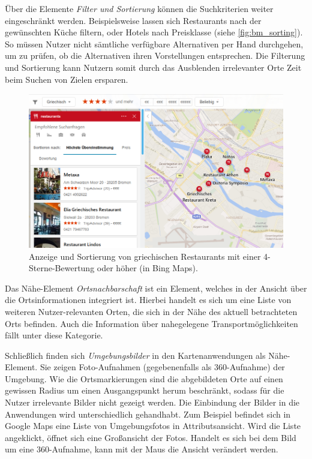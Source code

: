 Über die Elemente \emph{Filter und Sortierung} können die Suchkriterien weiter eingeschränkt werden.
Beispielsweise lassen sich Restaurants nach der gewünschten Küche filtern, oder Hotels nach Preisklasse (siehe \autoref{fig:bm_sorting}).
So müssen Nutzer nicht sämtliche verfügbare Alternativen per Hand durchgehen, um zu prüfen, ob die Alternativen ihren Vorstellungen entsprechen.
Die Filterung und Sortierung kann Nutzern somit durch das Ausblenden irrelevanter Orte Zeit beim Suchen von Zielen ersparen.
\begin{figure}[h]
    \includegraphics[width=\linewidth]{figures/map-app_examples/bm_filter_sorting}
    \caption{Anzeige und Sortierung von griechischen Restaurants mit einer 4-Sterne-Bewertung oder höher (in Bing Maps).}
    \label{fig:bm_sorting}
\end{figure}

Das Nähe-Element \emph{Ortsnachbarschaft} ist ein Element, welches in der Ansicht über die Ortsinformationen integriert ist.
Hierbei handelt es sich um eine Liste von weiteren Nutzer-relevanten Orten, die sich in der Nähe des aktuell betrachteten Orts befinden.
Auch die Information über nahegelegene Transportmöglichkeiten fällt unter diese Kategorie.

Schließlich finden sich \emph{Umgebungsbilder} in den Kartenanwendungen als Nähe-Element.
Sie zeigen Foto-Aufnahmen (gegebenenfalls als 360\textdegree-Aufnahme) der Umgebung.
Wie die Ortsmarkierungen sind die abgebildeten Orte auf einen gewissen Radius um einen Ausgangspunkt herum beschränkt, sodass für die Nutzer irrelevante Bilder nicht gezeigt werden.
Die Einbindung der Bilder in die Anwendungen wird unterschiedlich gehandhabt.
Zum Beispiel befindet sich in Google Maps eine Liste von Umgebungsfotos in Attributsansicht.
Wird die Liste angeklickt, öffnet sich eine Großansicht der Fotos.
Handelt es sich bei dem Bild um eine 360\textdegree-Aufnahme, kann mit der Maus die Ansicht verändert werden.


